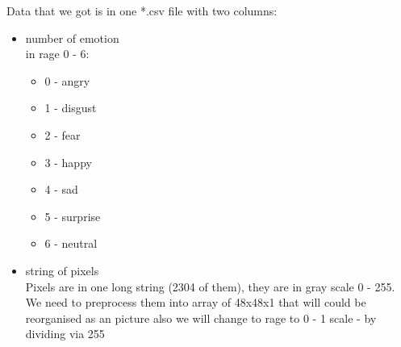 Data that we got is in one *.csv file with two columns:
\begin{itemize}
  \item number of emotion \\
    in rage 0 - 6:
    \begin{itemize}
        \item 0 - angry
        \item 1 - disgust
        \item 2 - fear
        \item 3 - happy
        \item 4 - sad
        \item 5 - surprise
        \item 6 - neutral
    \end{itemize}
  \item string of pixels \\
    Pixels are in one long string (2304 of them), they are in gray scale 0 - 255.\\
    We need to preprocess them into array of 48x48x1 that will could be reorganised as an picture also we will change to rage to 0 - 1 scale - by dividing via 255
    

\end{itemize}
